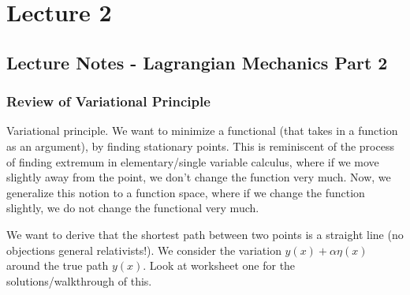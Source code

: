 \section{Lecture 2}
\subsection{Lecture Notes - Lagrangian Mechanics Part 2}
\subsubsection{Review of Variational Principle}
Variational principle. We want to minimize a functional (that takes in a function as an argument), by finding stationary points. This is reminiscent of the process of finding extremum in elementary/single variable calculus, where if we move slightly away from the point, we don't change the function very much. Now, we generalize this notion to a function space, where if we change the function slightly, we do not change the functional very much.

\noindent We want to derive that the shortest path between two points is a straight line (no objections general relativists!). We consider the variation $y(x) + \alpha\eta(x)$ around the true path $y(x)$. Look at worksheet one for the solutions/walkthrough of this.